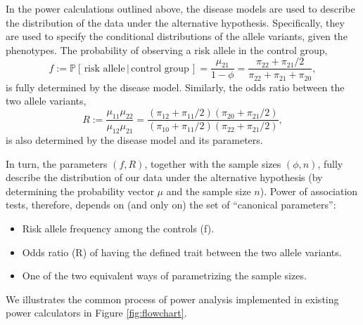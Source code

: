 In the power calculations outlined above, the disease models are used to describe the distribution of the data under the alternative hypothesis.
Specifically, they are used to specify the conditional distributions of the allele variants, given the phenotypes.
The probability of observing a risk allele in the control group,
\begin{equation}
    f := \mathbb{P}[\,\text{risk allele}\,|\,\text{control group}\,] 
    = \frac{\mu_{21}}{1-\phi} 
    = \frac{\pi_{22} + \pi_{21}/2}{\pi_{22} + \pi_{21} + \pi_{20}},
\end{equation}
is fully determined by the disease model.
Similarly, the odds ratio between the two allele variants, 
\begin{equation}
    R:=\frac{\mu_{11}\mu_{22}}{\mu_{12}\mu_{21}} 
    = \frac{(\pi_{12} + \pi_{11}/2)(\pi_{20} + \pi_{21}/2)}{(\pi_{10} + \pi_{11}/2)(\pi_{22} + \pi_{21}/2)},
\end{equation}
is also determined by the disease model and its parameters.

In turn, the parameters $(f, R)$, together with the sample sizes $(\phi, n)$, fully describe the distribution of our data under the alternative hypothesis (by determining the probability vector $\mu$ and the sample size $n$).
Power of association tests, therefore, depends on (and only on) the set of ``canonical parameters'':

\begin{itemize}
    \item Risk allele frequency among the controls (f).
    \item Odds ratio (R) of having the defined trait between the two allele variants.
    \item One of the two equivalent ways of parametrizing the sample sizes.
\end{itemize}

We illustrates the common process of power analysis implemented in existing power calculators in Figure \ref{fig:flowchart}.

